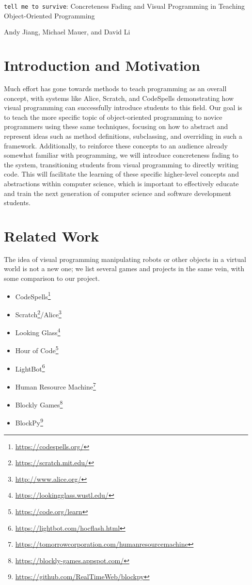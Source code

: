 \documentclass[12pt,notitlepage]{article}
\newcommand\footnoteref[1]{\footnote{\url{#1}}}
\begin{document}
\begingroup
  \centering
  {\Large \texttt{tell me to survive}: Concreteness Fading and Visual
    Programming in Teaching Object-Oriented Programming\\[1em]}

  Andy Jiang, Michael Mauer, and David Li\par
\endgroup

\section{Introduction and Motivation}

Much effort has gone towards methods to teach programming as an
overall concept, with systems like Alice, Scratch, and CodeSpells
demonstrating how visual programming can successfully introduce
students to this field. Our goal is to teach the more specific topic
of object-oriented programming to novice programmers using these same
techniques, focusing on how to abstract and represent ideas such as
method definitions, subclassing, and overriding in such a framework.
Additionally, to reinforce these concepts to an audience already
somewhat familiar with programming, we will introduce concreteness
fading to the system, transitioning students from visual programming
to directly writing code. This will facilitate the learning of these
specific higher-level concepts and abstractions within computer
science, which is important to effectively educate and train the next
generation of computer science and software development students.

\section{Related Work}

The idea of visual programming manipulating robots or other objects in
a virtual world is not a new one; we list several games and projects
in the same vein, with some comparison to our project.

\begin{itemize}
\item CodeSpells\footnoteref{https://codespells.org/}
\item Scratch\footnoteref{https://scratch.mit.edu/}/Alice\footnoteref{http://www.alice.org/}
\item Looking Glass\footnoteref{https://lookingglass.wustl.edu/}
\item Hour of Code\footnoteref{https://code.org/learn}
\item LightBot\footnoteref{https://lightbot.com/hocflash.html}
\item Human Resource Machine\footnoteref{https://tomorrowcorporation.com/humanresourcemachine}
\item Blockly Games\footnoteref{https://blockly-games.appspot.com/}
\item BlockPy\footnoteref{https://github.com/RealTimeWeb/blockpy}
\end{itemize}
\end{document}
